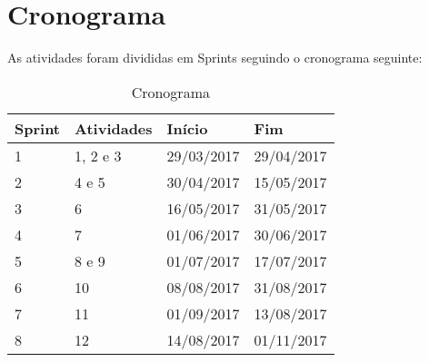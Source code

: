 \section[Cronograma]{Cronograma}

As atividades foram divididas em Sprints seguindo o cronograma seguinte:

\begin{table}[h]
	\centering
	\caption{Cronograma}
	\label{tab03}
  \begin{center}
      \begin{tabular}{ | l | l | p{5cm} | p{5cm}}
      \hline
      Sprint & Atividades & Início & Fim \\ \hline
      1 & 1, 2 e 3 & 29/03/2017 & 29/04/2017 \\ \hline
      2 & 4 e 5 & 30/04/2017 & 15/05/2017 \\ \hline
      3 & 6 & 16/05/2017 & 31/05/2017 \\ \hline
      4 & 7 & 01/06/2017 & 30/06/2017 \\ \hline
      5 & 8 e 9 & 01/07/2017 & 17/07/2017 \\ \hline
      6 & 10 & 08/08/2017 & 31/08/2017 \\ \hline
      7 & 11 & 01/09/2017 & 13/08/2017 \\ \hline
      8 & 12 & 14/08/2017 & 01/11/2017 \\ \hline
      \end{tabular}
  \end{center}
\end{table}






